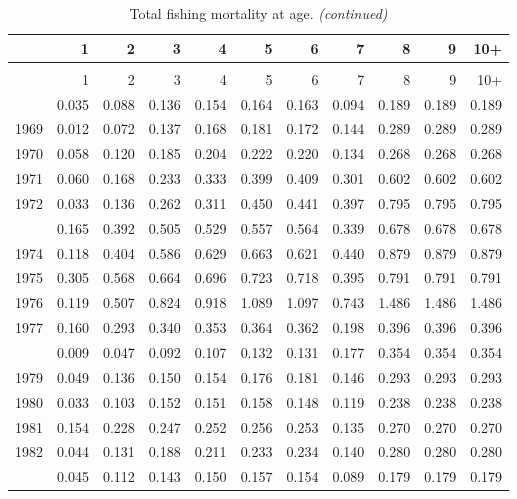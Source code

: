\documentclass[
]{article}
\begin{document}
\begin{longtable}[t]{lrrrrrrrrrr}
\caption{\label{tab:FAA-tot-table}Total fishing mortality at age.}\\
\toprule
  & 1 & 2 & 3 & 4 & 5 & 6 & 7 & 8 & 9 & 10+\\
\midrule
\endfirsthead
\caption[]{Total fishing mortality at age. \textit{(continued)}}\\
\toprule
  & 1 & 2 & 3 & 4 & 5 & 6 & 7 & 8 & 9 & 10+\\
\midrule
\endhead

\endfoot
\bottomrule
\endlastfoot
1968 & 0.035 & 0.088 & 0.136 & 0.154 & 0.164 & 0.163 & 0.094 & 0.189 & 0.189 & 0.189\\
1969 & 0.012 & 0.072 & 0.137 & 0.168 & 0.181 & 0.172 & 0.144 & 0.289 & 0.289 & 0.289\\
1970 & 0.058 & 0.120 & 0.185 & 0.204 & 0.222 & 0.220 & 0.134 & 0.268 & 0.268 & 0.268\\
1971 & 0.060 & 0.168 & 0.233 & 0.333 & 0.399 & 0.409 & 0.301 & 0.602 & 0.602 & 0.602\\
1972 & 0.033 & 0.136 & 0.262 & 0.311 & 0.450 & 0.441 & 0.397 & 0.795 & 0.795 & 0.795\\
\addlinespace
1973 & 0.165 & 0.392 & 0.505 & 0.529 & 0.557 & 0.564 & 0.339 & 0.678 & 0.678 & 0.678\\
1974 & 0.118 & 0.404 & 0.586 & 0.629 & 0.663 & 0.621 & 0.440 & 0.879 & 0.879 & 0.879\\
1975 & 0.305 & 0.568 & 0.664 & 0.696 & 0.723 & 0.718 & 0.395 & 0.791 & 0.791 & 0.791\\
1976 & 0.119 & 0.507 & 0.824 & 0.918 & 1.089 & 1.097 & 0.743 & 1.486 & 1.486 & 1.486\\
1977 & 0.160 & 0.293 & 0.340 & 0.353 & 0.364 & 0.362 & 0.198 & 0.396 & 0.396 & 0.396\\
\addlinespace
1978 & 0.009 & 0.047 & 0.092 & 0.107 & 0.132 & 0.131 & 0.177 & 0.354 & 0.354 & 0.354\\
1979 & 0.049 & 0.136 & 0.150 & 0.154 & 0.176 & 0.181 & 0.146 & 0.293 & 0.293 & 0.293\\
1980 & 0.033 & 0.103 & 0.152 & 0.151 & 0.158 & 0.148 & 0.119 & 0.238 & 0.238 & 0.238\\
1981 & 0.154 & 0.228 & 0.247 & 0.252 & 0.256 & 0.253 & 0.135 & 0.270 & 0.270 & 0.270\\
1982 & 0.044 & 0.131 & 0.188 & 0.211 & 0.233 & 0.234 & 0.140 & 0.280 & 0.280 & 0.280\\
\addlinespace
1983 & 0.045 & 0.112 & 0.143 & 0.150 & 0.157 & 0.154 & 0.089 & 0.179 & 0.179 & 0.179\\

\end{longtable}
\end{document}
